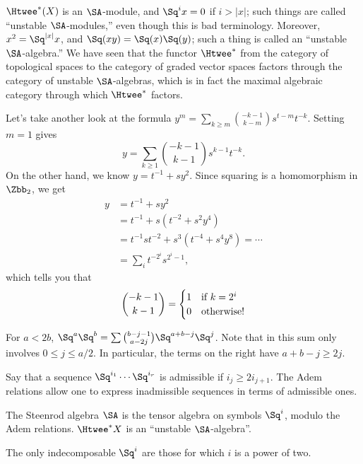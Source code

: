 $\Htwee^* (X)$ is an $\SA$-module, and $\Sq^i x = 0$ if $i > |x|$; such things are called ``unstable $\SA$-modules,'' even though this is bad terminology.  Moreover, $x^2 = \Sq^{|x|} x$, and $\Sq(xy) = \Sq(x) \Sq(y)$; such a thing is called an ``unstable $\SA$-algebra.''  %
We have seen that the functor $\Htwee^*$ from the category of topological spaces to the category of graded vector spaces factors through the category of unstable $\SA$-algebras, which is in fact
%
the maximal algebraic category through which $\Htwee^*$ factors. %

Let's take another look at the formula $y^m = \sum_{k \ge m} \binom{-k-1}{k-m} s^{t-m} t^{-k}$.  Setting $m=1$ gives \[y = \sum_{k \ge 1} \binom{-k-1}{k-1} s^{k-1} t^{-k}.\]  On the other hand, we know $y = t^{-1} + sy^2$.  Since squaring is a homomorphism in $\Zbb_2$, we get
\begin{align*}
y & = t^{-1} + sy^2 \\
& = t^{-1} + s(t^{-2} + s^2 y^4) \\
& = t^{-1} st^{-2} + s^3(t^{-4} + s^4y^8) = \cdots \\
& = \sum_i t^{-2^i} s^{2^i-1},
\end{align*}
which tells you that
\[
\binom{-k-1}{k-1} = \begin{cases} 1 & \hbox{if $k = 2^i$} \\ 0 & \hbox{otherwise!} \end{cases}
\]

\fi
\begin{SummaryNote}
\Bullet For $a<2b$, $\Sq^a\Sq^b=\sum\binom{b-j-1}{a-2j}\Sq^{a+b-j}\Sq^j$. Note that in this sum only involves $0\leq j\leq a/2$. In particular, the terms on the right have $a+b-j\geq 2j$.

\Bullet Say that a sequence $\Sq^{i_1}\cdots \Sq^{i_r}$ is admissible if $i_j\geq2i_{j+1}$. The Adem relations allow one to express inadmissible sequences in terms of admissible ones.

\Bullet The Steenrod algebra $\SA$ is the tensor algebra on symbols $\Sq^i$, modulo the Adem relations. $\Htwee^*X$ is an ``unstable $\SA$-algebra''.

\Bullet The only indecomposable $\Sq^i$ are those for which $i$ is a power of two.
\end{SummaryNote}

